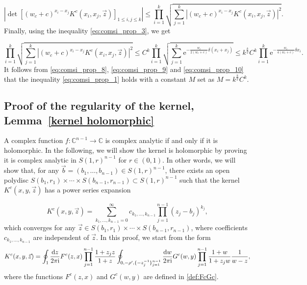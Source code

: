 \documentclass[cmp]{svjour}
\numberwithin{theorem}{section}
\numberwithin{equation}{section}
\def\dd{{\rm d}}
\def\ii{{\rm i}}
\begin{document}
\begin{equation}
\label{eq:comsi_prop_9}
\left| \det\left[ {(w_c + c)}^{x_i - x_j} K^c(x_i , x_j , \vec{z}) \right]_{1 \leq i , j \leq k }   \right| \leq \prod_{i=1}^{k}{ \sqrt{ \sum_{j=1}^{k}{ {\left|  {(w_c + c)}^{x_i - x_j} K^c(x_i , x_j , \vec{z})  \right|}^2 } } }.
\end{equation}
Finally, using the inequality \eqref{eq:comsi_prop_3}, we get

\begin{equation}
\label{eq:comsi_prop_10}
 \prod_{i=1}^{k}{ \sqrt{ \sum_{j=1}^{k}{ {\left|  {(w_c + c)}^{x_i - x_j} K^c(x_i , x_j , \vec{z})  \right|}^2 } } } \leq  {C }^k \prod_{i=1}^{k}{ \sqrt{ \sum_{j=1}^{k}{  \mathrm{e}^{ - \frac{w_c}{2(w_c + c)} \delta (x_i + x_j) }  } } } \leq  { k }^{\frac{k}{2}} C^k  \prod_{i=1}^{k}{ \mathrm{e}^{ - \frac{w_c}{4(w_c + c)} \delta x_i } }.
\end{equation}
It follows from \eqref{eq:comsi_prop_8}, \eqref{eq:comsi_prop_9} and \eqref{eq:comsi_prop_10} that the inequality \eqref{eq:comsi_prop_1} holds with a constant $M$ set as $M = { k }^{\frac{k}{2}} C^k$.


\subsection{Proof of the regularity of the kernel, Lemma~\ref{kernel holomorphic}}
\label{ap:kernel holomorphic}

A complex function $f : \mathbb{C}^{n-1} \rightarrow \mathbb{C}$ is complex analytic if and only if it is holomorphic.
In the following, we will show the kernel is holomorphic by proving it is complex analytic in ${S(1,r)}^{n-1}$ for $r \in (0, 1)$.
In other words, we will show that, for any $\vec{b} = (b_1,\ldots,b_{n-1}) \in {S(1,r)}^{n-1}$, there exists an open polydisc $S(b_1, r_1) \times \cdots \times S(b_{n-1}, r_{n-1}) \subset {S(1,r)}^{n-1}$ such that the kernel $K^c(x,y,\vec{z})$ has a power series expansion

\begin{equation*}
K^c(x,y,\vec{z}) =  \sum_{k_1,\ldots,k_{n-1} = 0}^{\infty}{ c_{k_1,\ldots,k_{n-1}} \prod_{j=1}^{n-1}{{(z_j - b_j)}^{k_j}}  } ,
\end{equation*}
which converges for any $\vec{z} \in S(b_1, r_1) \times \cdots \times S(b_{n-1}, r_{n-1})$, where coefficients $c_{k_1,\ldots,k_{n-1}}$ are independent of $\vec{z}$.
In this proof, we start from the form
\begin{equation}\label{Holomorphic_start_kernel}
K^c(x,y,\vec{z}) =   \oint_{1} \frac{\dd z}{2 \pi \ii} F^c(z,x)  \prod_{j=1}^{n-1}{ \frac{1 + z_j z}{1 + z} } 
 \oint_{0 , - \rho' ,  \{ - z_j^{-1} \}_{j=1}^{n-1} } \frac{\dd w}{2 \pi \ii} G^c(w,y) \prod_{j=1}^{n-1}{\frac{1 + w}{1 + z_j w}} \frac{1}{w-z},
\end{equation}
where the functions $F^c(z,x)$ and $G^c(w,y)$ are defined in \eqref{def:FcGc}.
\end{document}
